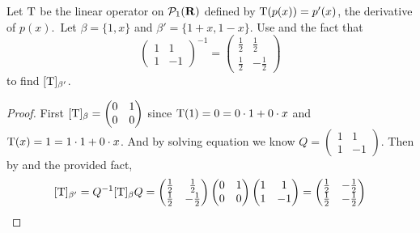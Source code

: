 \begin{exercise} \label{exercise 2.5.5}
Let \(\mathrm{T}\) be the linear operator on \(\mathcal{P}_1(\mathbf{R})\) defined by \(\mathrm{T}(p(x)) = p'(x)\), the derivative of \(p(x)\).\
Let \(\beta = \{ 1, x \}\) and \(\beta' = \{ 1 + x, 1 - x \}\).
Use  and the fact that
\[
    \begin{pmatrix} 1 & 1 \\ 1 & -1 \end{pmatrix}^{-1} =
    \begin{pmatrix} \frac1{2} & \frac1{2} \\ \frac1{2} & -\frac1{2} \end{pmatrix}
\]
to find \([\mathrm{T}]_{\beta'}\).
\end{exercise}

\begin{proof}

First \([\mathrm{T}]_{\beta} = \begin{pmatrix} 0 & 1 \\ 0 & 0 \end{pmatrix}\) since \(\mathrm{T}(1) = 0 = 0 \cdot 1 + 0 \cdot x\) and \(\mathrm{T}(x) = 1 = 1 \cdot 1 + 0 \cdot x\).
And by solving equation we know \(Q = \begin{pmatrix} 1 & 1 \\ 1 & -1 \end{pmatrix}\).
Then by \THM{2.23} and the provided fact,
\[
    [\mathrm{T}]_{\beta'} = Q^{-1} [\mathrm{T}]_{\beta} Q =
    \begin{pmatrix} \frac1{2} & \frac1{2} \\ \frac1{2} & -\frac1{2} \end{pmatrix}
    \begin{pmatrix} 0 & 1 \\ 0 & 0 \end{pmatrix}
    \begin{pmatrix} 1 & 1 \\ 1 & -1 \end{pmatrix}
    = \begin{pmatrix} \frac1{2} & -\frac1{2} \\ \frac1{2} & -\frac1{2} \end{pmatrix}
\]
\end{proof}

